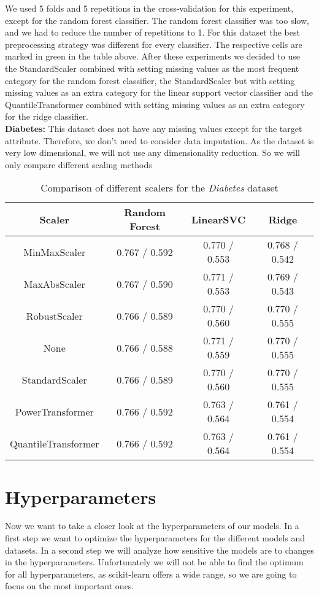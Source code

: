 \documentclass[a4paper,12pt]{article}
\begin{document}
We used 5 folds and 5 repetitions in the cross-validation for this experiment, except for the random forest
classifier. The random forest classifier was too slow, and we had to reduce the number of repetitions to 1.
For this dataset the best
preprocessing strategy was different for every classifier. The respective cells are marked in green in the
table above. After these experiments we decided to use the StandardScaler combined with setting missing
values as the most frequent category for the random forest classifier, the StandardScaler but with setting
missing values as an extra category for the linear support vector classifier and the QuantileTransformer
combined with setting missing values as an extra category for the ridge classifier.\\
\textbf{Diabetes:} This dataset does not have any missing values except for the target attribute. Therefore, we 
 don't need to consider data imputation. As the dataset is very low dimensional, we will not use any dimensionality reduction. 
 So we will only compare different scaling methods 
 \begin{table}[h!]
\centering
\begin{tabular}{|c|c|c|c|}
\hline
\textbf{Scaler} & \textbf{Random Forest } & \textbf{LinearSVC } & \textbf{Ridge } \\
\hline
MinMaxScaler & \cellcolor[HTML]{C1E1C1} 0.767 / 0.592 & 0.770 / 0.553 & 0.768 / 0.542 \\
\hline
MaxAbsScaler & 0.767 / 0.590 & 0.771 / 0.553 & 0.769 / 0.543 \\
\hline
RobustScaler & 0.766 / 0.589 & 0.770 / 0.560 & 0.770 / 0.555 \\
\hline
None & 0.766 / 0.588 & 0.771 / 0.559 & 0.770 / 0.555 \\
\hline
StandardScaler & 0.766 / 0.589 & \cellcolor[HTML]{C1E1C1}0.770 / 0.560 &\cellcolor[HTML]{C1E1C1} 0.770 / 0.555 \\
\hline
PowerTransformer & 0.766 / 0.592 & 0.763 / 0.564 & 0.761 / 0.554 \\
\hline
QuantileTransformer & 0.766 / 0.592 & 0.763 / 0.564 & 0.761 / 0.554 \\
\hline
\end{tabular}
\caption{Comparison of different scalers for the \textit{Diabetes} dataset}
\label{table:diabetesscalers}
\end{table}







\section{Hyperparameters}
Now we want to take a closer look at the hyperparameters of our models. In a first step we want to optimize the hyperparameters for the different models and datasets.
In a second step we will analyze how sensitive the models are to changes in the hyperparameters. Unfortunately we will not be able to find the optimum for all hyperparameters, as scikit-learn offers a wide range, so we are going to focus on the most important ones.\\
\end{document}
